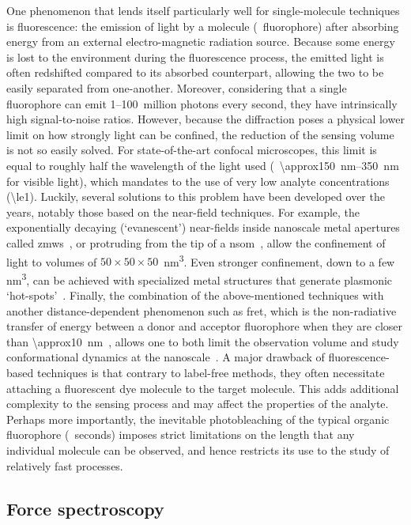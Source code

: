 One phenomenon that lends itself particularly well for single-molecule techniques is fluorescence: the
emission of light by a molecule (\ie~fluorophore) after absorbing energy from an external electro-magnetic
radiation source. Because some energy is lost to the environment during the fluorescence process, the emitted
light is often redshifted compared to its absorbed counterpart, allowing the two to be easily separated from
one-another. Moreover, considering that a single fluorophore can emit \numrange{1}{100}~million photons every
second, they have intrinsically high signal-to-noise ratios. However, because the diffraction poses a physical
lower limit on how strongly light can be confined, the reduction of the sensing volume is not so easily
solved. For state-of-the-art confocal microscopes, this limit is equal to roughly half the wavelength of the
light used (\ie~\SIrange{\approx150}{350}{\nm} for visible light), which mandates to the use of very low
analyte concentrations (\SI{\le1}{\nM}). Luckily, several solutions to this problem have been developed over
the years, notably those based on the near-field techniques. For example, the exponentially decaying
(`evanescent') near-fields inside nanoscale metal apertures called
\glspl{zmw}~\cite{Levene-2003,Eid-2009,Zhu-2012}, or protruding from the tip of a
\gls{nsom}~\cite{Ambrose-1994,Hosaka-2001}, allow the confinement of light to volumes of
$50\times50\times50$~\si{\cubic\nm}. Even stronger confinement, down to a few \si{\cubic\nm}, can be achieved
with specialized metal structures that generate plasmonic `hot-spots'~\cite{Xin-Lu-2019}. Finally, the
combination of the above-mentioned techniques with another distance-dependent phenomenon such as \gls{fret},
which is the non-radiative transfer of energy between a donor and acceptor fluorophore when they are closer
than \SI{\approx10}{\nm}~\cite{Roy-2008}, allows one to both limit the observation volume and study
conformational dynamics at the nanoscale~\cite{Kim-2013}. A major drawback of fluorescence-based techniques is
that contrary to label-free methods, they often necessitate attaching a fluorescent dye molecule to the
target molecule. This adds additional complexity to the sensing process and may affect the properties of the
analyte. Perhaps more importantly, the inevitable photobleaching of the typical organic fluorophore
(\ie~seconds) imposes strict limitations on the length that any individual molecule can be observed, and hence
restricts its use to the study of relatively fast processes.


\subsection{Force spectroscopy}
%

